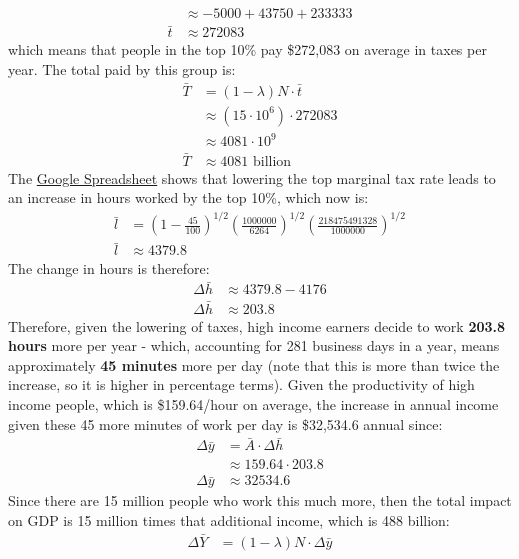 \documentclass[]{book}
\begin{document}
\begin{enumerate}
\[\begin{aligned}
  &\approx -5000 + 43750 + 233333 \\
  \bar{t}&\approx 272083
  \end{aligned}
  \] which means that people in the top 10\% pay \$272,083 on average in
  taxes per year. The total paid by this group is: \[
  \begin{aligned}
  \bar{T} &= (1-\lambda) N \cdot \bar{t}\\
  &\approx \left(15 \cdot 10^{6}\right) \cdot 272083\\
  &\approx 4081 \cdot 10^9\\
  \bar{T} &\approx 4081 \text{ billion}
  \end{aligned}
  \] The
  \href{https://docs.google.com/spreadsheets/d/1faC3VTuXmo7wo4njkO2ERytzlJmbMgcckVj9ag_Mn6s/edit?usp=sharing}{Google
  Spreadsheet} shows that lowering the top marginal tax rate leads to an
  increase in hours worked by the top 10\%, which now is: \[
  \begin{aligned}
  \bar{l}&=\left(1-\frac{45}{100}\right)^{1/2}\left(\frac{1000000}{6264}\right)^{1/2}\left(\frac{218475491328}{1000000}\right)^{1/2}\\
  \bar{l}&\approx 4379.8
  \end{aligned}
  \] The change in hours is therefore: \[
  \begin{aligned}
  \Delta \bar{h} &\approx 4379.8 - 4176\\
  \Delta \bar{h} &\approx 203.8
  \end{aligned}
  \] Therefore, given the lowering of taxes, high income earners decide
  to work \textbf{203.8 hours} more per year - which, accounting for 281
  business days in a year, means approximately \textbf{45 minutes} more
  per day (note that this is more than twice the increase, so it is
  higher in percentage terms). Given the productivity of high income
  people, which is \$159.64/hour on average, the increase in annual
  income given these 45 more minutes of work per day is \$32,534.6
  annual since: \[
  \begin{aligned}
  \Delta \bar{y} &=  \bar{A} \cdot \Delta \bar{h}\\
  & \approx 159.64 \cdot 203.8\\
  \Delta \bar{y} & \approx 32534.6
  \end{aligned}
  \] Since there are 15 million people who work this much more, then the
  total impact on GDP is 15 million times that additional income, which
  is 488 billion: \[
  \begin{aligned}
  \Delta \bar{Y} &= (1-\lambda) N \cdot \Delta \bar{y}\\

\end{aligned}\]
\end{enumerate}
\end{document}
